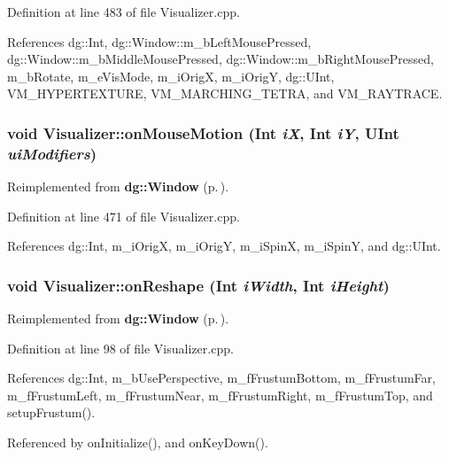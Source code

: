 Definition at line 483 of file Visualizer.cpp.

References dg::Int, dg::Window::m\_\-b\-Left\-Mouse\-Pressed, dg::Window::m\_\-b\-Middle\-Mouse\-Pressed, dg::Window::m\_\-b\-Right\-Mouse\-Pressed, m\_\-b\-Rotate, m\_\-e\-Vis\-Mode, m\_\-i\-Orig\-X, m\_\-i\-Orig\-Y, dg::UInt, VM\_\-HYPERTEXTURE, VM\_\-MARCHING\_\-TETRA, and VM\_\-RAYTRACE.
\subsubsection{\setlength{\rightskip}{0pt plus 5cm}void Visualizer::on\-Mouse\-Motion ({\bf Int} {\em i\-X}, {\bf Int} {\em i\-Y}, {\bf UInt} {\em ui\-Modifiers})\hspace{0.3cm}{\tt  [virtual]}}\label{classdg_1_1Visualizer_a9}




Reimplemented from {\bf dg::Window} {\rm (p.\,\pageref{classdg_1_1Window_a15})}.

Definition at line 471 of file Visualizer.cpp.

References dg::Int, m\_\-i\-Orig\-X, m\_\-i\-Orig\-Y, m\_\-i\-Spin\-X, m\_\-i\-Spin\-Y, and dg::UInt.
\subsubsection{\setlength{\rightskip}{0pt plus 5cm}void Visualizer::on\-Reshape ({\bf Int} {\em i\-Width}, {\bf Int} {\em i\-Height})\hspace{0.3cm}{\tt  [virtual]}}\label{classdg_1_1Visualizer_a4}




Reimplemented from {\bf dg::Window} {\rm (p.\,\pageref{classdg_1_1Window_a5})}.

Definition at line 98 of file Visualizer.cpp.

References dg::Int, m\_\-b\-Use\-Perspective, m\_\-f\-Frustum\-Bottom, m\_\-f\-Frustum\-Far, m\_\-f\-Frustum\-Left, m\_\-f\-Frustum\-Near, m\_\-f\-Frustum\-Right, m\_\-f\-Frustum\-Top, and setup\-Frustum().

Referenced by on\-Initialize(), and on\-Key\-Down().
